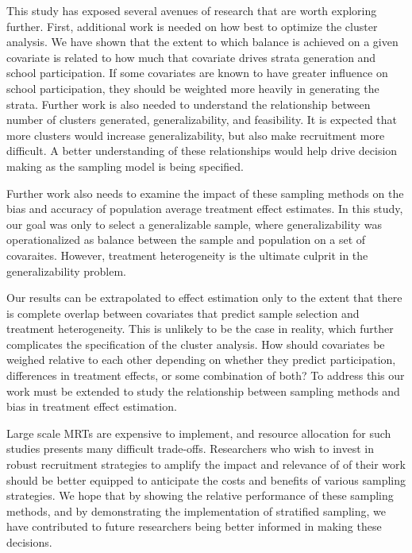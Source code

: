 \documentclass[man,floatsintext]{apa6}
\begin{document}
This study has exposed several avenues of research that are worth exploring further. First, additional work is needed on how best to optimize the cluster analysis. We have shown that the extent to which balance is achieved on a given covariate is related to how much that covariate drives strata generation and school participation. If some covariates are known to have greater influence on school participation, they should be weighted more heavily in generating the strata. Further work is also needed to understand the relationship between number of clusters generated, generalizability, and feasibility. It is expected that more clusters would increase generalizability, but also make recruitment more difficult. A better understanding of these relationships would help drive decision making as the sampling model is being specified.

Further work also needs to examine the impact of these sampling methods on the bias and accuracy of population average treatment effect estimates. In this study, our goal was only to select a generalizable sample, where generalizability was operationalized as balance between the sample and population on a set of covaraites. However, treatment heterogeneity is the ultimate culprit in the generalizability problem.

Our results can be extrapolated to effect estimation only to the extent that there is complete overlap between covariates that predict sample selection and treatment heterogeneity. This is unlikely to be the case in reality, which further complicates the specification of the cluster analysis. How should covariates be weighed relative to each other depending on whether they predict participation, differences in treatment effects, or some combination of both? To address this our work must be extended to study the relationship between sampling methods and bias in treatment effect estimation.

Large scale MRTs are expensive to implement, and resource allocation for such studies presents many difficult trade-offs. Researchers who wish to invest in robust recruitment strategies to amplify the impact and relevance of of their work should be better equipped to anticipate the costs and benefits of various sampling strategies. We hope that by showing the relative performance of these sampling methods, and by demonstrating the implementation of stratified sampling, we have contributed to future researchers being better informed in making these decisions.
\end{document}
